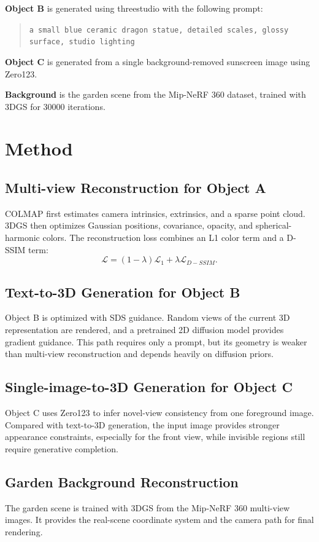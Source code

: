 \documentclass[11pt]{article}
\begin{document}
\textbf{Object B} is generated using threestudio with the following prompt:
\begin{quote}
\texttt{a small blue ceramic dragon statue, detailed scales, glossy surface, studio lighting}
\end{quote}

\textbf{Object C} is generated from a single background-removed sunscreen image using Zero123.

\textbf{Background} is the garden scene from the Mip-NeRF 360 dataset, trained with 3DGS for 30000 iterations.

\section{Method}
\subsection{Multi-view Reconstruction for Object A}
COLMAP first estimates camera intrinsics, extrinsics, and a sparse point cloud. 3DGS then optimizes Gaussian positions, covariance, opacity, and spherical-harmonic colors. The reconstruction loss combines an L1 color term and a D-SSIM term:
\begin{equation}
\mathcal{L}=(1-\lambda)\mathcal{L}_{1}+\lambda \mathcal{L}_{D-SSIM}.
\end{equation}

\subsection{Text-to-3D Generation for Object B}
Object B is optimized with SDS guidance. Random views of the current 3D representation are rendered, and a pretrained 2D diffusion model provides gradient guidance. This path requires only a prompt, but its geometry is weaker than multi-view reconstruction and depends heavily on diffusion priors.

\subsection{Single-image-to-3D Generation for Object C}
Object C uses Zero123 to infer novel-view consistency from one foreground image. Compared with text-to-3D generation, the input image provides stronger appearance constraints, especially for the front view, while invisible regions still require generative completion.

\subsection{Garden Background Reconstruction}
The garden scene is trained with 3DGS from the Mip-NeRF 360 multi-view images. It provides the real-scene coordinate system and the camera path for final rendering.
\end{document}
